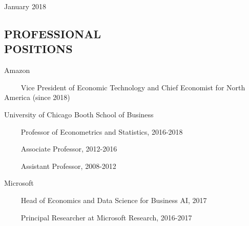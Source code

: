 \documentclass[margin,line]{res}
\begin{document}
\hfill {\sc January 2018}

\begin{resume}

\medskip



\medskip
\section{\bf PROFESSIONAL\\ POSITIONS}

{\sc Amazon}

\vspace{-.4cm}~~~~ Vice President of Economic Technology and Chief Economist for North America (since 2018)


\vspace{-.2cm}

{\sc University of Chicago Booth School of Business}

\vspace{-.4cm}~~~~ Professor of Econometrics and Statistics, 2016-2018 

\vspace{-.4cm}~~~~ Associate Professor, 2012-2016


\vspace{-.4cm} ~~~~ Assistant Professor,  2008-2012


\vspace{-.2cm}
{\sc Microsoft}

\vspace{-.4cm}~~~~ Head of Economics and Data Science for Business AI, 2017

\vspace{-.4cm}~~~~ Principal Researcher at Microsoft Research, 2016-2017



\end{resume}
\end{document}
